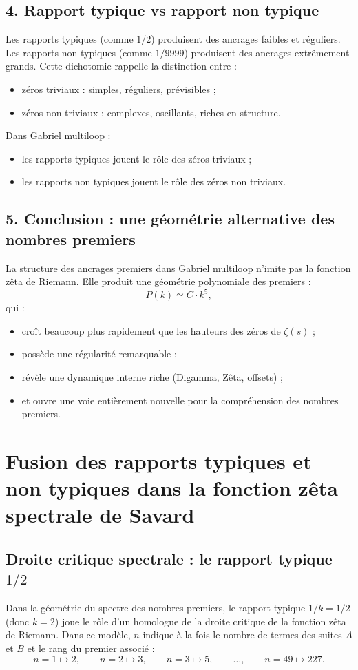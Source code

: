 \documentclass[11pt,a4paper]{article}
\begin{document}
\subsection*{4. Rapport typique vs rapport non typique}

Les rapports typiques (comme $1/2$) produisent des ancrages faibles et réguliers. Les
rapports non typiques (comme $1/9999$) produisent des ancrages extrêmement grands.
Cette dichotomie rappelle la distinction entre :
\begin{itemize}[nosep]
  \item zéros triviaux : simples, réguliers, prévisibles ;
  \item zéros non triviaux : complexes, oscillants, riches en structure.
\end{itemize}
Dans Gabriel multiloop :
\begin{itemize}[nosep]
  \item les rapports typiques jouent le rôle des zéros triviaux ;
  \item les rapports non typiques jouent le rôle des zéros non triviaux.
\end{itemize}

\subsection*{5. Conclusion : une géométrie alternative des nombres premiers}

La structure des ancrages premiers dans Gabriel multiloop n'imite pas la fonction zêta
de Riemann. Elle produit une géométrie polynomiale des premiers :
\[
P(k)\simeq C\cdot k^{5},
\]
qui :
\begin{itemize}[nosep]
  \item croît beaucoup plus rapidement que les hauteurs des zéros de $\zeta(s)$ ;
  \item possède une régularité remarquable ;
  \item révèle une dynamique interne riche (Digamma, Zêta, offsets) ;
  \item et ouvre une voie entièrement nouvelle pour la compréhension des nombres
  premiers.
\end{itemize}

\section{Fusion des rapports typiques et non typiques dans la fonction zêta spectrale de Savard}

\subsection{Droite critique spectrale : le rapport typique \texorpdfstring{$1/2$}{1/2}}
Dans la géométrie du spectre des nombres premiers, le rapport typique
$1/k=1/2$ (donc $k=2$) joue le rôle d'un homologue de la droite critique
de la fonction zêta de Riemann. Dans ce modèle, $n$ indique à la fois le
nombre de termes des suites $A$ et $B$ et le rang du premier associé :
\[
n=1\mapsto 2,\qquad n=2\mapsto 3,\qquad n=3\mapsto 5,\qquad
\ldots,\qquad n=49\mapsto 227.
\]
\end{document}
